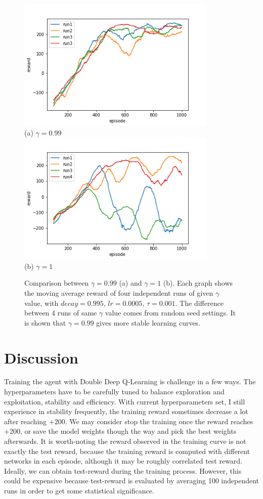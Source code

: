 \documentclass[conference]{IEEEtran}
\begin{document}
\begin{figure}
	\includegraphics[height=2.5in]{figures/gamma099.png}  \\ 
	\centering (a) $\gamma=0.99$\\
	\includegraphics[height=2.5in]{figures/gamma1.png}  \\ 
	\centering (b)  $\gamma=1$
	\caption{Comparison between $\gamma=0.99$ (a) and $\gamma=1$ (b). Each graph shows the moving average reward of four independent runs of given $\gamma$ value, with $decay=0.995$, $lr=0.0005$, $\tau=0.001$. The difference between 4 runs of same $\gamma$ value comes from random seed settings. It is shown that $\gamma=0.99$ gives more stable learning curves.}
	\label{fig:gamma}
\end{figure}
	
\section{Discussion}
Training the agent with Double Deep Q-Learning is challenge in a few ways. The hyperparameters have to be carefully tuned to balance exploration and exploitation, stability and efficiency. With current hyperparameters set, I still experience in stability frequently, the training reward sometimes decrease a lot after reaching +200. We may consider stop the training once the reward reaches +200, or save the model weights though the way and pick the best weights afterwards. It is worth-noting the reward observed in the training curve is not exactly the test reward, because the training reward is computed with different networks in each episode, although it may be roughly correlated test reward. Ideally, we can obtain test-reward during the training process. However, this could be expensive because test-reward is evaluated by averaging 100 independent runs in order to get some statistical significance.
\end{document}
